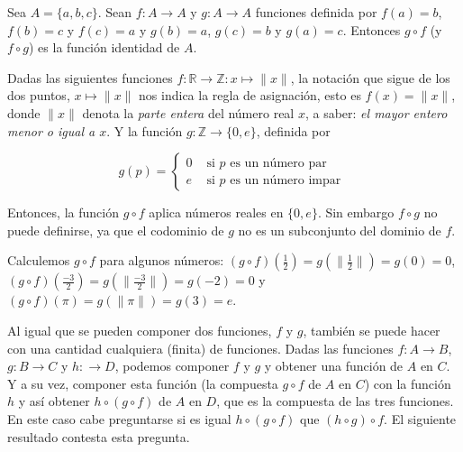 \documentclass[12pt,]{krantz}
\theoremstyle{definition}
\theoremstyle{definition}
\theoremstyle{definition}
\theoremstyle{remark}
\let\BeginKnitrBlock\begin \let\EndKnitrBlock\end
\begin{document}
\BeginKnitrBlock{example}
\protect\hypertarget{exm:unnamed-chunk-35}{}{\label{exm:unnamed-chunk-35}
}Sea \(A=\{a,b,c\}\). Sean \(f:A\longrightarrow A\) y
\(g:A\longrightarrow A\) funciones definida por \(f(a)=b\), \(f(b)=c\) y
\(f(c)=a\) y \(g(b)=a\), \(g(c)=b\) y \(g(a)=c\). Entonces \(g\circ f\)
(y \(f\circ g\)) es la función identidad de \(A\).
\EndKnitrBlock{example}

\BeginKnitrBlock{example}
\protect\hypertarget{exm:unnamed-chunk-36}{}{\label{exm:unnamed-chunk-36}
}Dadas las siguientes funciones
\(f:\mathbb{R}\longrightarrow \mathbb{Z}:x\longmapsto \lVert x\rVert\),
la notación que sigue de los dos puntos, \(x\longmapsto \lVert x\rVert\)
nos indica la regla de asignación, esto es \(f(x)=\lVert x\rVert\),
donde \(\lVert x\rVert\) denota la \textit{parte entera} del número real
\(x\), a saber: \textit{el mayor entero menor o igual a $x$}. Y la
función \(g:\mathbb{Z}\longrightarrow \{0,e\}\), definida por

\begin{equation}
    g(p) = \left\{
    \begin{array}{ll}
    0      & \mbox{ si } p \mbox{ es un número par } \\
    e      & \mbox{ si } p \mbox{ es un número impar }
 \end{array}
    \right.
\end{equation}

Entonces, la función \(g\circ f\) aplica números reales en \(\{0,e\}\).
Sin embargo \(f\circ g\) no puede definirse, ya que el codominio de
\(g\) no es un subconjunto del dominio de \(f\).

Calculemos \(g\circ f\) para algunos números:
\((g\circ f)(\frac{1}{2})=g(\lVert \frac{1}{2} \rVert)=g(0)=0\),
\((g\circ f)(\frac{-3}{2})=g(\lVert \frac{-3}{2} \rVert)=g(-2)=0\) y
\((g\circ f)(\pi)=g(\lVert \pi \rVert)=g(3)=e\).
\EndKnitrBlock{example}

Al igual que se pueden componer dos funciones, \(f\) y \(g\), también se
puede hacer con una cantidad cualquiera (finita) de funciones. Dadas las
funciones \(f:A\longrightarrow B\), \(g:B\longrightarrow C\) y
\(h:\longrightarrow D\), podemos componer \(f\) y \(g\) y obtener una
función de \(A\) en \(C\). Y a su vez, componer esta función (la
compuesta \(g\circ f\) de \(A\) en \(C\)) con la función \(h\) y así
obtener \(h\circ (g\circ f)\) de \(A\) en \(D\), que es la compuesta de
las tres funciones. En este caso cabe preguntarse si es igual
\(h\circ (g\circ f)\) que \((h\circ g)\circ f\). El siguiente resultado
contesta esta pregunta.
\end{document}
